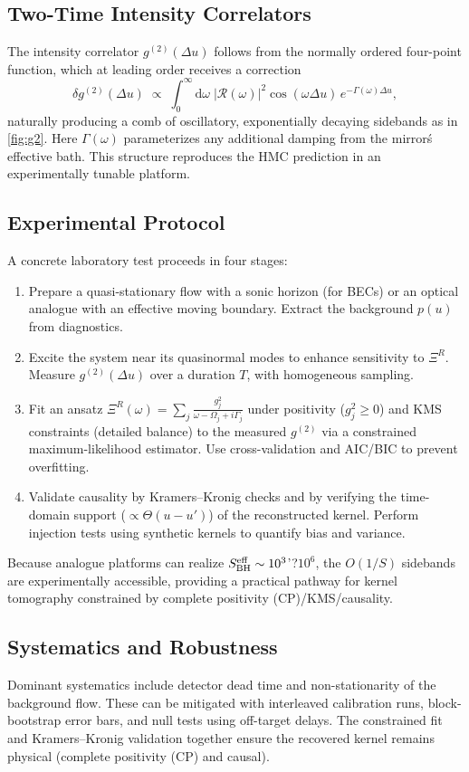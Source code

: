 \documentclass[11pt,a4paper]{article}
\newcommand{\HMC}{\textsc{HMC}\xspace}
\theoremstyle{plain}
\theoremstyle{definition}
\theoremstyle{remark}
\begin{document}
\subsection{Two-Time Intensity Correlators}
The intensity correlator $g^{(2)}(\Delta u)$ follows from the normally ordered four-point function, which at leading order receives a correction
\begin{equation}
\delta g^{(2)}(\Delta u)\;\propto\; \int_{0}^{\infty} \mathrm{d}\omega\;\left|\mathcal{R}(\omega)\right|^2\cos(\omega\Delta u)\,e^{-\Gamma(\omega)\Delta u},
\end{equation}
naturally producing a comb of oscillatory, exponentially decaying sidebands as in \cref{fig:g2}. Here $\Gamma(\omega)$ parameterizes any additional damping from the mirror\'s effective bath. This structure reproduces the \HMC{} prediction in an experimentally tunable platform.

\subsection{Experimental Protocol}
A concrete laboratory test proceeds in four stages:
\begin{enumerate}
  \item Prepare a quasi-stationary flow with a sonic horizon (for BECs) or an optical analogue with an effective moving boundary. Extract the background $p(u)$ from diagnostics.
  \item Excite the system near its quasinormal modes to enhance sensitivity to $\Xi^R$. Measure $g^{(2)}(\Delta u)$ over a duration $T$, with homogeneous sampling.
  \item Fit an ansatz $\Xi^R(\omega)=\sum_j \frac{g_j^2}{\omega-\Omega_j+i\Gamma_j}$ under positivity ($g_j^2\ge 0$) and KMS constraints (detailed balance) to the measured $g^{(2)}$ via a constrained maximum-likelihood estimator. Use cross-validation and AIC/BIC to prevent overfitting.
  \item Validate causality by Kramers--Kronig checks and by verifying the time-domain support ($\propto \Theta(u-u')$) of the reconstructed kernel. Perform injection tests using synthetic kernels to quantify bias and variance.
\end{enumerate}
Because analogue platforms can realize $S_{\rm BH}^{\rm eff}\sim 10^3$'?$10^6$, the $O(1/S)$ sidebands are experimentally accessible, providing a practical pathway for kernel tomography constrained by complete positivity (CP)/KMS/causality.

\subsection{Systematics and Robustness}
Dominant systematics include detector dead time and non-stationarity of the background flow. These can be mitigated with interleaved calibration runs, block-bootstrap error bars, and null tests using off-target delays. The constrained fit and Kramers--Kronig validation together ensure the recovered kernel remains physical (complete positivity (CP) and causal).
\end{document}
